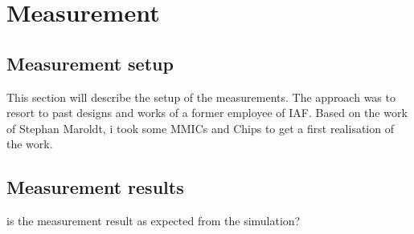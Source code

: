\chapter{Measurement}
\section{Measurement setup}
This section will describe the setup of the measurements. The approach was to resort to past designs and works of a former employee of IAF. Based on the work of Stephan Maroldt, i took some MMICs and Chips to get a first realisation of the work.
\section{Measurement results}
is the measurement result as expected from the simulation?